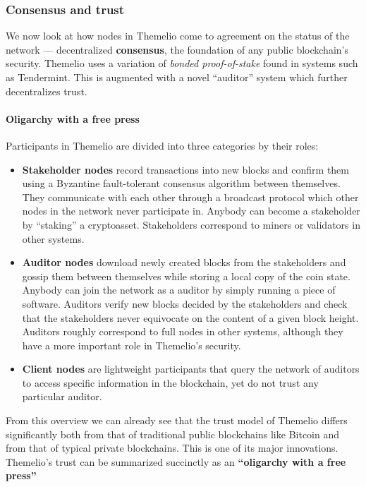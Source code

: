 \documentclass[]{article}
\providecommand{\tightlist}{%
  \setlength{\itemsep}{0pt}\setlength{\parskip}{0pt}}
\let\oldparagraph\paragraph
\renewcommand{\paragraph}[1]{\oldparagraph{#1}\mbox{}}
\begin{document}
\hypertarget{consensus-and-trust}{%
\subsubsection{Consensus and trust }\label{consensus-and-trust}}

We now look at how nodes in Themelio come to agreement on the status of
the network --- decentralized \textbf{consensus}, the foundation of any
public blockchain's security. Themelio uses a variation of \emph{bonded
proof-of-stake} found in systems such as Tendermint. This is augmented
with a novel ``auditor'' system which further decentralizes trust.

\hypertarget{oligarchy-with-a-free-press}{%
\paragraph{Oligarchy with a free
press}\label{oligarchy-with-a-free-press}}

Participants in Themelio are divided into three categories by their
roles:

\begin{itemize}
\tightlist
\item
  \textbf{Stakeholder nodes} record transactions into new blocks and
  confirm them using a Byzantine fault-tolerant consensus algorithm
  between themselves. They communicate with each other through a
  broadcast protocol which other nodes in the network never participate
  in. Anybody can become a stakeholder by ``staking'' a cryptoasset.
  Stakeholders correspond to miners or validators in other systems.
\item
  \textbf{Auditor nodes} download newly created blocks from the
  stakeholders and gossip them between themselves while storing a local
  copy of the coin state. Anybody can join the network as a auditor by
  simply running a piece of software. Auditors verify new blocks decided
  by the stakeholders and check that the stakeholders never equivocate
  on the content of a given block height. Auditors roughly correspond to
  full nodes in other systems, although they have a more important role
  in Themelio's security.
\item
  \textbf{Client nodes} are lightweight participants that query the
  network of auditors to access specific information in the blockchain,
  yet do not trust any particular auditor.
\end{itemize}

From this overview we can already see that the trust model of Themelio
differs significantly both from that of traditional public blockchains
like Bitcoin and from that of typical private blockchains. This is one
of its major innovations. Themelio's trust can be summarized succinctly
as an \textbf{``oligarchy with a free press''}
\end{document}
